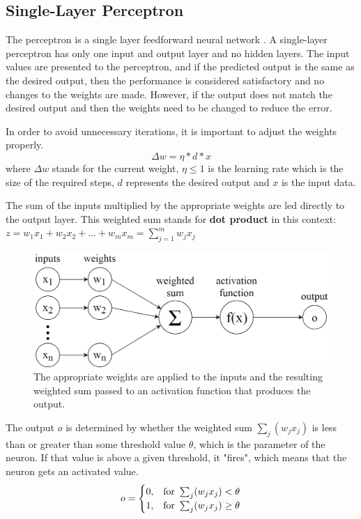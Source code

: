 \subsection{Single-Layer Perceptron}

The perceptron is a single layer feedforward neural network \cite{tho2010perceptron}. A single-layer perceptron has only one input and output layer and no hidden layers. The input values are presented to the perceptron, and if the predicted output is the same as the desired output, then the performance is considered satisfactory and no changes to the weights are made. However, if the output does not match the desired output and then the weights need to be changed to reduce the error. \smallskip

In order to avoid unnecessary iterations, it is important to adjust the weights properly.
$$ \Delta w = \eta * d * x $$
where $\Delta w$ stands for the current weight, $\eta \leq 1$ is the learning rate which is the size of the required steps, $d$ represents the desired output and $x$ is the input data. \medskip

The sum of the inputs multiplied by the appropriate weights are led directly to the output layer. This weighted sum stands for \textbf{dot product} in this context: $ z = w_1 x_1 + w_2 x_2 + \dots + w_m x_m = \sum_{j=1}^m w_j x_j $

\begin{figure}[h]
	\centering
	\includegraphics[height=0.28\linewidth]{./figures/perceptron}
	\caption{The appropriate weights are applied to the inputs and the resulting weighted sum passed to an activation function that produces the output.}
	\label{fig:perceptron}
\end{figure}

The output $o$ is determined by whether the weighted sum $\sum_j(w_j x_j)$ is less than or greater than some threshold value $\theta$, which is the parameter of the neuron. If that value is above a given threshold, it "fires", which means that the neuron gets an activated value. 
$$ o = \begin{cases} 0, & \hbox{for}~ \sum_j(w_j x_j) < \theta \\ 1, & \hbox{for}~ \sum_j(w_j x_j) \geq \theta \end{cases} $$



